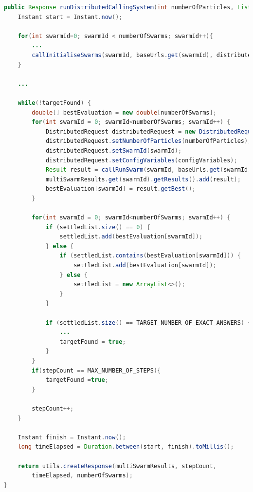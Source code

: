 \documentclass[oneside,12pt]{book}
\begin{document}
\begin{lstlisting}[basicstyle=\footnotesize, language=Java]
public Response runDistributedCallingSystem(int numberOfParticles, List<String> baseUrls, ConfigVariables configVariables) {
    Instant start = Instant.now();

    for(int swarmId=0; swarmId < numberOfSwarms; swarmId++){
        ...
        callInitialiseSwarms(swarmId, baseUrls.get(swarmId), distributedRequest);
    }

    ...

    while(!targetFound) {
        double[] bestEvaluation = new double[numberOfSwarms];
        for(int swarmId = 0; swarmId<numberOfSwarms; swarmId++) {
            DistributedRequest distributedRequest = new DistributedRequest();
            distributedRequest.setNumberOfParticles(numberOfParticles);
            distributedRequest.setSwarmId(swarmId);
            distributedRequest.setConfigVariables(configVariables);
            Result result = callRunSwarm(swarmId, baseUrls.get(swarmId) ,distributedRequest);
            multiSwarmResults.get(swarmId).getResults().add(result);
            bestEvaluation[swarmId] = result.getBest();
        }

        for(int swarmId = 0; swarmId<numberOfSwarms; swarmId++) {
            if (settledList.size() == 0) {
                settledList.add(bestEvaluation[swarmId]);
            } else {
                if (settledList.contains(bestEvaluation[swarmId])) {
                    settledList.add(bestEvaluation[swarmId]);
                } else {
                    settledList = new ArrayList<>();
                }
            }

            if (settledList.size() == TARGET_NUMBER_OF_EXACT_ANSWERS) {
                ...
                targetFound = true;
            }
        }
        if(stepCount == MAX_NUMBER_OF_STEPS){
            targetFound =true;
        }

        stepCount++;
    }

    Instant finish = Instant.now();
    long timeElapsed = Duration.between(start, finish).toMillis();

    return utils.createResponse(multiSwarmResults, stepCount, 
        timeElapsed, numberOfSwarms);
}
\end{lstlisting}
\label{listing:DistributedService}
\end{document}
